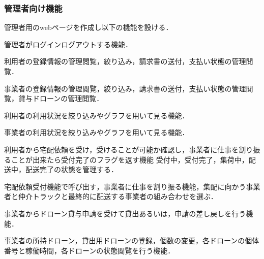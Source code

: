\documentclass[a4paper, titlepage]{jsarticle}
\begin{document}
\subsubsection{管理者向け機能}
管理者用のwebページを作成し以下の機能を設ける．
\begin{description}[labelwidth=\linewidth]
  \setlength{\leftskip}{1em}
  \item [ログインログアウト機能]管理者がログインログアウトする機能．
  \item [利用者管理機能]利用者の登録情報の管理閲覧，絞り込み，請求書の送付，支払い状態の管理閲覧．
  \item [事業者管理機能]事業者の登録情報の管理閲覧，絞り込み，請求書の送付，支払い状態の管理閲覧，貸与ドローンの管理閲覧．
  \item [利用者情報分析機能]利用者の利用状況を絞り込みやグラフを用いて見る機能．
  \item [事業者情報分析機能]事業者の利用状況を絞り込みやグラフを用いて見る機能．
  \item [宅配依頼受付機能]利用者から宅配依頼を受け，受けることが可能か確認し，事業者に仕事を割り振ることが出来たら受付完了のフラグを返す機能 受付中，受付完了，集荷中，配送中，配送完了の状態を管理する．
  \item [宅配仕事割り振り機能]宅配依頼受付機能で呼び出す，事業者に仕事を割り振る機能，集配に向かう事業者と仲介トラックと最終的に配送する事業者の組み合わせを選ぶ．
  \item [ドローン貸与機能]事業者からドローン貸与申請を受けて貸出あるいは，申請の差し戻しを行う機能．
  \item [事業者ドローン情報管理機能]事業者の所持ドローン，貸出用ドローンの登録，個数の変更，各ドローンの個体番号と稼働時間，各ドローンの状態閲覧を行う機能．
\end{description}
\end{document}
